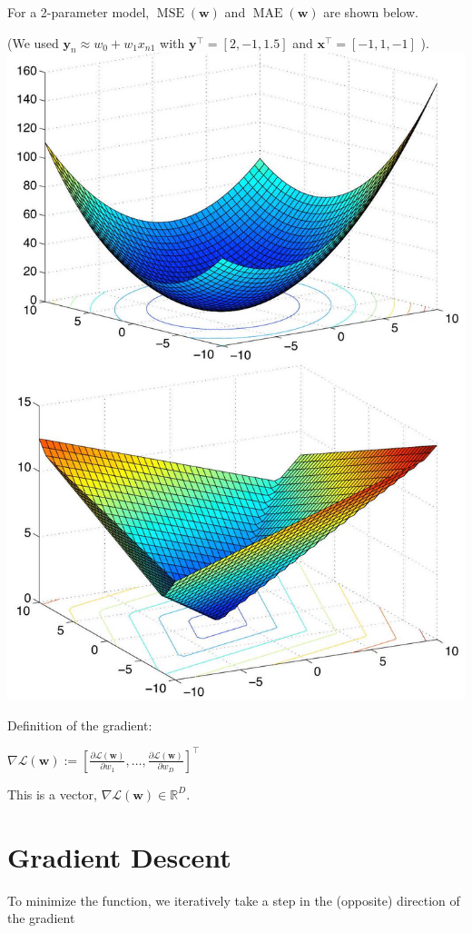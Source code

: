 \documentclass[10pt]{article}
\begin{document}
For a 2-parameter model, $\operatorname{MSE}(\mathbf{w})$ and $\operatorname{MAE}(\mathbf{w})$ are shown below.

(We used $\mathbf{y}_{n} \approx w_{0}+w_{1} x_{n 1}$ with $\mathbf{y}^{\top}=[2,-1,1.5]$ and $\mathbf{x}^{\top}=[-1,1,-1]$ ).
\includegraphics[max width=\textwidth, center]{2023_12_30_4ff132a3450066e65b4fg-05}

Definition of the gradient:

$\nabla \mathcal{L}(\mathbf{w}):=\left[\frac{\partial \mathcal{L}(\mathbf{w})}{\partial w_{1}}, \ldots, \frac{\partial \mathcal{L}(\mathbf{w})}{\partial w_{D}}\right]^{\top}$

This is a vector, $\nabla \mathcal{L}(\mathbf{w}) \in \mathbb{R}^{D}$.

\section*{Gradient Descent}
To minimize the function, we iteratively take a step in the (opposite) direction of the gradient
\end{document}
